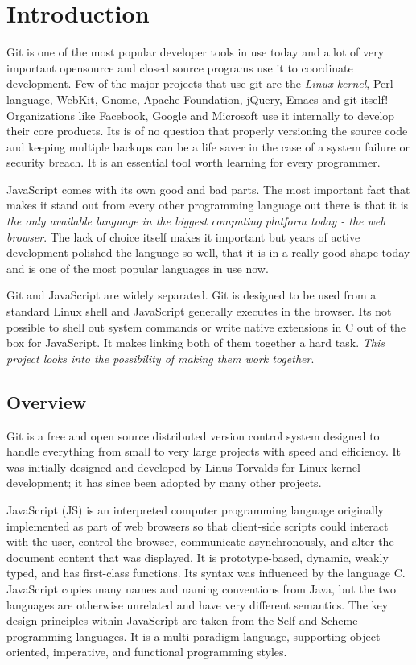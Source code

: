 \chapter{Introduction}

Git is one of the most popular developer tools in use today and a lot of very
important opensource and closed source programs use it to coordinate
development. Few of the major projects that use git are the \textit{Linux
  kernel}, Perl language, WebKit, Gnome, Apache Foundation, jQuery, Emacs and
git itself! Organizations like Facebook, Google and Microsoft use it internally
to develop their core products. Its is of no question that properly versioning
the source code and keeping multiple backups can be a life saver in the case of
a system failure or security breach. It is an essential tool worth learning for
every programmer.

JavaScript comes with its own good and bad parts. The most important fact that
makes it stand out from every other programming language out there is that it is
\textit{the only available language in the biggest computing platform today -
  the web browser}. The lack of choice itself makes it important but years of
active development polished the language so well, that it is in a really good
shape today and is one of the most popular languages in use now.

Git and JavaScript are widely separated. Git is designed to be used from a
standard Linux shell and JavaScript generally executes in the browser. Its not
possible to shell out system commands or write native extensions in C out of the
box for JavaScript. It makes linking both of them together a hard task.
\textit{This project looks into the possibility of making them work together}.

\section{Overview}

Git is a free and open source distributed version control system designed to
handle everything from small to very large projects with speed and efficiency.
It was initially designed and developed by Linus Torvalds for Linux kernel
development; it has since been adopted by many other projects.

JavaScript (JS) is an interpreted computer programming language originally
implemented as part of web browsers so that client-side scripts could interact
with the user, control the browser, communicate asynchronously, and alter the
document content that was displayed. It is prototype-based, dynamic, weakly
typed, and has first-class functions. Its syntax was influenced by the language
C. JavaScript copies many names and naming conventions from Java, but the two
languages are otherwise unrelated and have very different semantics. The key
design principles within JavaScript are taken from the Self and Scheme
programming languages. It is a multi-paradigm language, supporting
object-oriented, imperative, and functional programming styles.

